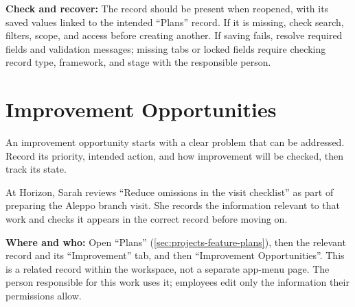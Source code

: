 \textbf{Check and recover:} The record should be present when reopened, with its saved values linked to the intended “Plans” record. If it is missing, check search, filters, scope, and access before creating another. If saving fails, resolve required fields and validation messages; missing tabs or locked fields require checking record type, framework, and stage with the responsible person.

\clearpage
\section{Improvement Opportunities}
\label{sec:projects-feature-planning-improvement-opportunities}

An improvement opportunity starts with a clear problem that can be addressed. Record its priority, intended action, and how improvement will be checked, then track its state.

\begin{rcnote}
At Horizon, Sarah reviews “Reduce omissions in the visit checklist” as part of preparing the Aleppo branch visit. She records the information relevant to that work and checks it appears in the correct record before moving on.
\end{rcnote}

\textbf{Where and who:} Open “Plans” (\ref{sec:projects-feature-plans}), then the relevant record and its “Improvement” tab, and then “Improvement Opportunities”. This is a related record within the workspace, not a separate app-menu page. The person responsible for this work uses it; employees edit only the information their permissions allow.

